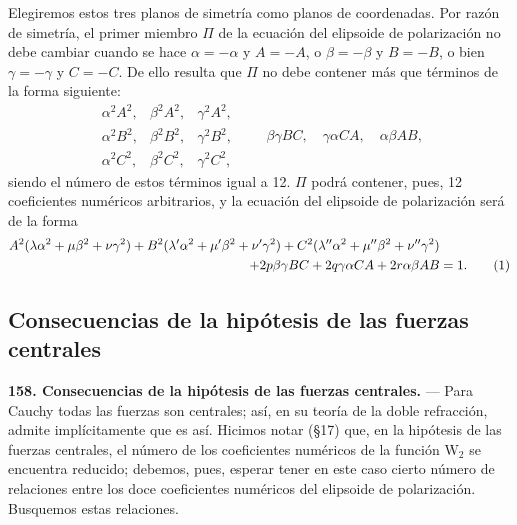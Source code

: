 Elegiremos estos tres planos de simetría como planos de coordenadas. Por
razón de simetría, el primer miembro $\Pi$ de la ecuación del elipsoide de
polarización no debe cambiar cuando se hace $\alpha=-\alpha$ y $A=-A$, o
$\beta=-\beta$ y $B=-B$, o bien $\gamma=-\gamma$ y $C=-C$. De ello resulta
que $\Pi$ no debe contener más que términos de la forma siguiente:
\[
\begin{array}{lll}
\alpha^2A^2, & \beta^2A^2, & \gamma^2A^2,\\
\alpha^2B^2, & \beta^2B^2, & \gamma^2B^2,\\
\alpha^2C^2, & \beta^2C^2, & \gamma^2C^2,
\end{array}
\qquad
\beta\gamma BC,\quad \gamma\alpha CA,\quad \alpha\beta AB,
\]
siendo el número de estos términos igual a 12. $\Pi$ podrá contener,
pues, 12 coeficientes numéricos arbitrarios, y la ecuación del elipsoide
de polarización será de la forma
\begin{align}
A^2(\lambda\alpha^2+\mu\beta^2+\nu\gamma^2)
+B^2(\lambda'\alpha^2+\mu'\beta^2+\nu'\gamma^2)
+C^2(\lambda''\alpha^2+\mu''\beta^2+\nu''\gamma^2)&\notag\\
+2p\beta\gamma BC+2q\gamma\alpha CA+2r\alpha\beta AB&=1.
\tag{1}
\end{align}

\subsection{Consecuencias de la hipótesis de las fuerzas centrales}

\noindent\textbf{158. Consecuencias de la hipótesis de las fuerzas
centrales.} — Para Cauchy todas las fuerzas son centrales; así, en su
teoría de la doble refracción, admite implícitamente que es así. Hicimos
notar (§17) que, en la hipótesis de las fuerzas centrales, el número de los
coeficientes numéricos de la función $\mathrm{W}_2$ se encuentra reducido; debemos,
pues, esperar tener en este caso cierto número de relaciones entre los
doce coeficientes numéricos del elipsoide de polarización. Busquemos estas
relaciones.

